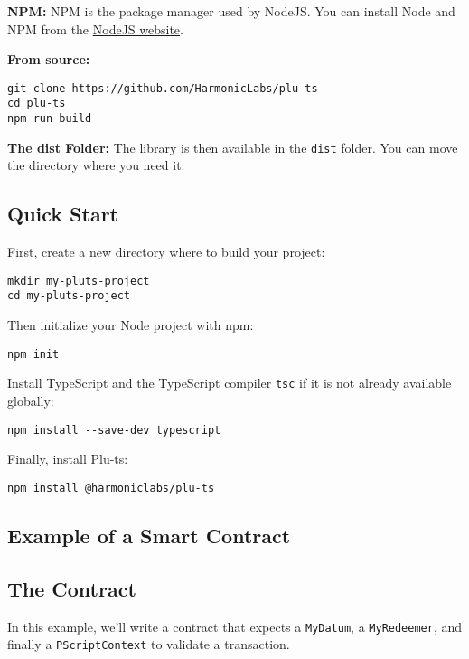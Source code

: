 \textbf{NPM:}
NPM is the package manager used by NodeJS. You can install Node and NPM from the \href{https://nodejs.org/}{NodeJS website}.

\textbf{From source:}
\begin{verbatim}
git clone https://github.com/HarmonicLabs/plu-ts
cd plu-ts
npm run build
\end{verbatim}

\textbf{The dist Folder:}
The library is then available in the \texttt{dist} folder. You can move the directory where you need it.

\subsection{Quick Start}
First, create a new directory where to build your project:
\begin{verbatim}
mkdir my-pluts-project
cd my-pluts-project
\end{verbatim}

Then initialize your Node project with npm:
\begin{verbatim}
npm init
\end{verbatim}

Install TypeScript and the TypeScript compiler \texttt{tsc} if it is not already available globally:
\begin{verbatim}
npm install --save-dev typescript
\end{verbatim}

Finally, install Plu-ts:
\begin{verbatim}
npm install @harmoniclabs/plu-ts
\end{verbatim}

\subsection{Example of a Smart Contract}

\subsection{The Contract}
In this example, we'll write a contract that expects a \texttt{MyDatum}, a \texttt{MyRedeemer}, and finally a \texttt{PScriptContext} to validate a transaction.



